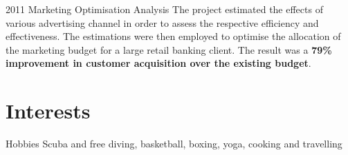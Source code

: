 \documentclass{tccv}
\begin{document}
\begin{yearlist}


  
\item{2011} {Marketing Optimisation Analysis} {The project estimated the effects of
  various advertising channel in order to assess the respective
  efficiency and effectiveness. The estimations were then employed to
  optimise the allocation of the marketing budget for a large retail
  banking client. The result was a \textbf{79\% improvement in
    customer acquisition over the existing budget}.}

\end{yearlist}

  

\vspace{10cm}


\section{Interests}

\begin{factlist}
\item{Hobbies} {Scuba and free diving, basketball, boxing, yoga, cooking and
  travelling}
\end{factlist}
\end{document}
